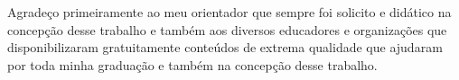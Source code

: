 Agradeço primeiramente ao meu orientador que sempre foi solicito e didático na concepção desse trabalho e também aos diversos educadores e organizações que disponibilizaram gratuitamente conteúdos de extrema qualidade que ajudaram por toda minha graduação e também na concepção desse trabalho.